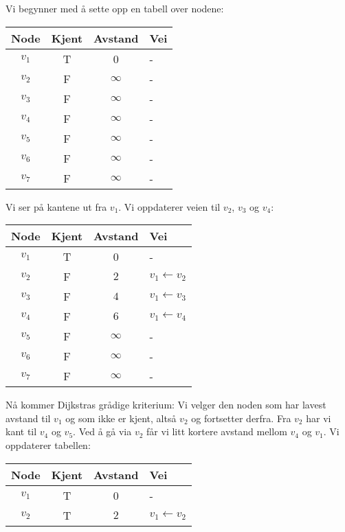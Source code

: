 \begin{eks}
\noindent Vi begynner med å sette opp en tabell over nodene:
\begin{center}
\begin{tabular}{c | c | c | l}
	 Node   & Kjent & Avstand    & Vei \\ \hline
	$ v_1 $ & T     & 0          & -   \\
	$ v_2 $ & F     & $ \infty $ & -   \\
	$ v_3 $ & F     & $ \infty $ & -   \\
	$ v_4 $ & F     & $ \infty $ & -   \\
	$ v_5 $ & F     & $ \infty $ & -   \\
	$ v_6 $ & F     & $ \infty $ & -   \\
	$ v_7 $ & F     & $ \infty $ & -
\end{tabular}
\end{center}
Vi ser på kantene ut fra $ v_1 $. Vi oppdaterer veien til $ v_2 $, $ v_3 $ og $ v_4 $:
\begin{center}
\begin{tabular}{c | c | c | l}
	 Node   & Kjent & Avstand    & Vei                    \\ \hline
	$ v_1 $ & T     & 0          & -                      \\
	$ v_2 $ & F     & $ 2 $      & $ v_1 \leftarrow v_2 $ \\
	$ v_3 $ & F     & $ 4 $      & $ v_1 \leftarrow v_3 $ \\
	$ v_4 $ & F     & $ 6 $      & $ v_1 \leftarrow v_4 $ \\
	$ v_5 $ & F     & $ \infty $ & -                      \\
	$ v_6 $ & F     & $ \infty $ & -                      \\
	$ v_7 $ & F     & $ \infty $ & -
\end{tabular}
\end{center}
Nå kommer Dijkstras grådige kriterium: Vi velger den noden som har lavest avstand til $ v_1 $ og som ikke er kjent, altså $ v_2 $ og fortsetter derfra. Fra $ v_2 $ har vi kant til $ v_4 $ og $ v_5 $. Ved å gå via $ v_2 $ får vi litt kortere avstand mellom $ v_4 $ og $ v_1 $. Vi oppdaterer tabellen:
\begin{center}
\begin{tabular}{c | c | c | l}
	 Node   & Kjent & Avstand    & Vei                                   \\ \hline
	$ v_1 $ & T     & 0          & -                                     \\
	$ v_2 $ & T     & $ 2 $      & $ v_1 \leftarrow v_2 $                \\

\end{tabular}
\end{center}
\end{eks}
